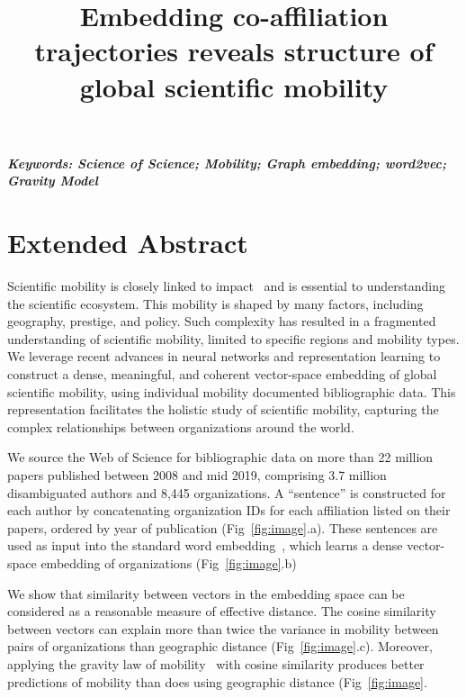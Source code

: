\documentclass[a4paper,12pt]{article}
\title{Embedding co-affiliation trajectories reveals structure of global scientific mobility}
\author[]{} %
\date{}
\begin{document}
\maketitle
\thispagestyle{fancy}

\vspace{-6em}
\begin{center}
\textbf{\textit{Keywords: Science of Science; Mobility; Graph embedding; word2vec; Gravity Model}}
\newline
\end{center}

\section*{Extended Abstract}

Scientific mobility is closely linked to impact~\autocite{sugimoto_scientists_2017} and is essential to understanding the scientific ecosystem.
This mobility is shaped by many factors, including geography, prestige, and policy\autocite{deville_career_2014}.
Such complexity has resulted in a fragmented understanding of scientific mobility, limited to specific regions and mobility types.
We leverage recent advances in neural networks and representation learning to construct a dense, meaningful, and coherent vector-space embedding of global scientific mobility, using individual mobility documented bibliographic data. 
This representation facilitates the holistic study of scientific mobility, capturing the complex relationships between organizations around the world. 

We source the Web of Science for bibliographic data on more than 22 million papers published between 2008 and mid 2019, comprising 3.7 million disambiguated authors and 8,445 organizations. 
A ``sentence'' is constructed for each author by concatenating organization IDs for each affiliation listed on their papers, ordered by year of publication (Fig~\ref{fig:image}.a).
These sentences are used as input into the standard word embedding~\autocite{mikolov_distributed_2013}, which learns a dense vector-space embedding of organizations (Fig~\ref{fig:image}.b) 

We show that similarity between vectors in the embedding space can be considered as a reasonable measure of effective distance. 
The cosine similarity between vectors can explain more than twice the variance in mobility between pairs of organizations than geographic distance (Fig~\ref{fig:image}.c). 
Moreover, applying the gravity law of mobility~\cite{simini_universal_2012} with cosine similarity produces better predictions of mobility than does using geographic distance (Fig~\ref{fig:image}.
\end{document}
